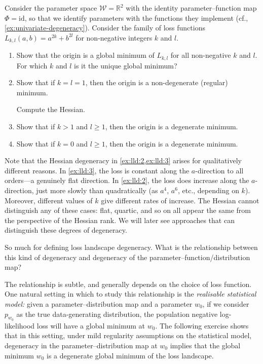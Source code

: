 \documentclass[11pt]{article}
\newcommand{\R}{\mathbb{R}}
\newcommand{\W}{\mathcal{W}}
\begin{document}
\begin{exercise}
\label{ex:loss-landscape-degeneracy}
    Consider the parameter space $\W = \R^2$ with the identity
    parameter--function map $\Phi = \mathrm{id}$, so that we identify
    parameters with the functions they implement
    (cf., \cref{ex:univariate-degeneracy}).
    Consider the family of loss functions
        $L_{k,l}(a,b) = a^{2k} + b^{2l}$
    for non-negative integers $k$ and $l$.
\begin{enumerate}
    \item
        Show that the origin is a global minimum of $L_{k,l}$ for all
        non-negative $k$ and $l$. For which $k$ and $l$ is it the unique global
        minimum?
    \item
        \label{ex:lld:1}
        Show that if $k = l = 1$, then the origin is a non-degenerate
        (regular) minimum.
        \begin{hint}
Compute the Hessian.
        \end{hint}
    \item
        \label{ex:lld:2}
        Show that if $k > 1$ and $l \geq 1$, then the origin is a
        degenerate minimum.
    \item
        \label{ex:lld:3}
        Show that if $k = 0$ and $l \geq 1$, then the origin is a
        degenerate minimum.
\end{enumerate}
\end{exercise}

Note that the Hessian degeneracy in \cref{ex:lld:2,ex:lld:3} arises for
qualitatively different reasons. In \cref{ex:lld:3}, the loss is constant along
the $a$-direction to all orders---a genuinely flat direction. In
\cref{ex:lld:2}, the loss does increase along the $a$-direction, just more
slowly than quadratically (as $a^4$, $a^6$, etc., depending on $k$). Moreover,
different values of $k$ give different rates of increase. The Hessian cannot
distinguish any of these cases: flat, quartic, and so on all appear the same
from the perspective of the Hessian rank. We will later see approaches that can
distinguish these degrees of degeneracy.

So much for defining loss landscape degeneracy. What is the relationship
between this kind of degeneracy and degeneracy of the
parameter--function/distribution map?

The relationship is subtle, and generally depends on the choice of loss
function. One natural setting in which to study this relationship is the
\emph{realisable statistical model:} given a parameter--distribution map and a
parameter $w_0$, if we consider $p_{w_0}$ as the true data-generating
distribution, the population negative log-likelihood loss will have a global
minimum at $w_0$. The following exercise shows that in this setting, under mild
regularity assumptions on the statistical model, degeneracy in the
parameter--distribution map at $w_0$ implies that the global minimum $w_0$ is a
degenerate global minimum of the loss landscape.
\end{document}
